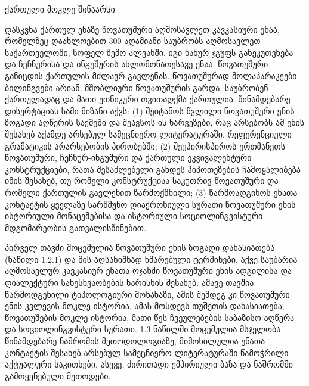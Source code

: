 		 {\foreignlanguage{georgian}{ქართული მოკლე შინაარსი}}
\begin{otherlanguage}{georgian}
    დასკვნა ქართულ ენაზე
	წოვათუშური  აღმოსავლეთ კავკასიური ენაა, რომელზეც დაახლოებით 300 ადამიანი საუბრობს აღმოსავლეთ საქართველოში, სოფელ ზემო ალვანში. იგი ნახურ ჯგუფს განეკუთვნება და ჩეჩნურისა და ინგუშურის  ახლომონათესავე ენაა. წოვათუშური განიცდის ქართულის მძლავრ გავლენას. წოვათუშურად მოლაპარაკეები ბილინგვები არიან, მშობლიური წოვათუშურის გარდა, საუბრობენ ქართულადაც და მათი ეთნიკური თვითაღქმა ქართულია. წინამდებარე დისერტაციას სამი მიზანი აქვს: (1) შეიტანოს წვლილი  წოვათუშური ენის ზოგადი აღწერის საქმეში და შეავსოს ის ხარვეზები, რაც არსებობს ამ ენის შესახებ აქამდე არსებულ სამეცნიერო ლიტერატურაში, რეფერენციული გრამატიკის არარსებობის პირობებში; (2) შეუპირისპიროს ერთმანეთს   წოვათუშური, ჩეჩნურ-ინგუშური და ქართული ეკვივალენტური კონსტრუქციები, რათა შესაძლებელი გახდეს ჰიპოთეზების ჩამოყალიბება იმის შესახებ, თუ რომელი კონსტრუქციაა საკუთრივ წოვათუშური და რომელი ქართულის გავლენით წარმოქმნილი; (3) წარმოადგინოს ენათა კონტაქტის ყველაზე სარწმუნო დიაქრონიული სურათი წოვათუშური ენის ისტორიული მონაცემებისა და ისტორიული სოციოლინგვისტური მდგომარეობის გათვალისწინებით.


	პირველ თავში მოცემულია წოვათუშური ენის ზოგადი დახასიათება (ნაწილი 1.2.1) და მის აღსანიშნად ხმარებული  ტერმინები, აქვე საუბარია აღმოსავლურ კავკასიურ ენათა ოჯახში წოვათუშური ენის ადგილისა და დიალექტური სახესხვაობების ხარისხის შესახებ. ამავე თავშია წარმოდგენილი ტიპოლოგიური მონახაზი, ამის შემდეგ კი წოვათუშური ენის კვლევის მოკლე ისტორია. ამას მოსდევს თუშეთის დახასიათება, წოვათუშების მოკლე ისტორია, მათი წეს-ჩვეულებების საბაზისო აღწერა და სოციოლინგვისტური სურათი. 1.3 ნაწილში  მოცემულია მსჯელობა წინამდებარე ნაშრომის მეთოდოლოგიაზე, მიმოხილულია ენათა კონტაქტის შესახებ არსებულ სამეცნიერო ლიტერატურაში წამოჭრილი აქტუალური საკითხები, ასევე, ძირითადი ემპირიული ბაზა და ნაშრომში გამოყენებული მეთოდები.



\end{otherlanguage}

